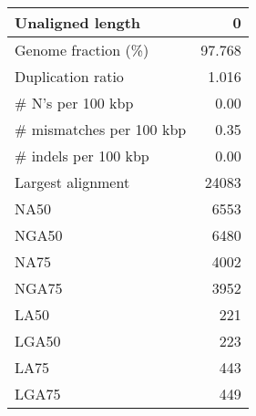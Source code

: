 \documentclass[12pt,a4paper]{article}
\begin{document}
\begin{table}[ht]
\begin{center}
\begin{tabular}{|l*{1}{|r}|}
Unaligned length & 0 \\ \hline
Genome fraction (\%) & 97.768 \\ \hline
Duplication ratio & 1.016 \\ \hline
\# N's per 100 kbp & 0.00 \\ \hline
\# mismatches per 100 kbp & 0.35 \\ \hline
\# indels per 100 kbp & 0.00 \\ \hline
Largest alignment & 24083 \\ \hline
NA50 & 6553 \\ \hline
NGA50 & 6480 \\ \hline
NA75 & 4002 \\ \hline
NGA75 & 3952 \\ \hline
LA50 & 221 \\ \hline
LGA50 & 223 \\ \hline
LA75 & 443 \\ \hline
LGA75 & 449 \\ \hline
\end{tabular}
\end{center}
\end{table}
\end{document}
